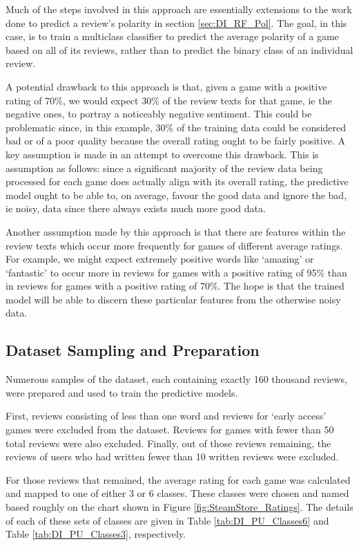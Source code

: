 Much of the steps involved in this approach are essentially extensions to the work done to predict a review's polarity in section \ref{sec:DI_RF_Pol}. The goal, in this case, is to train a multiclass classifier to predict the average polarity of a game based on all of its reviews, rather than to predict the binary class of an individual review.

A potential drawback to this approach is that, given a game with a positive rating of 70\%, we would expect 30\% of the review texts for that game, ie the negative ones, to portray a noticeably negative sentiment. This could be problematic since, in this example, 30\% of the training data could be considered bad or of a poor quality because the overall rating ought to be fairly positive. A key assumption is made in an attempt to overcome this drawback. This is assumption as follows: since a significant majority of the review data being processed for each game does actually align with its overall rating, the predictive model ought to be able to, on average, favour the good data and ignore the bad, ie noisy, data since there always exists much more good data.

Another assumption made by this approach is that there are features within the review texts which occur more frequently for games of different average ratings. For example, we might expect extremely positive words like `amazing' or `fantastic' to occur more in reviews for games with a positive rating of 95\% than in reviews for games with a positive rating of 70\%. The hope is that the trained model will be able to discern these particular features from the otherwise noisy data.

\subsection{Dataset Sampling and Preparation}

Numerous samples of the dataset, each containing exactly 160 thousand reviews, were prepared and used to train the predictive models.

First, reviews consisting of less than one word and reviews for `early access' games were excluded from the dataset. Reviews for games with fewer than 50 total reviews were also excluded. Finally, out of those reviews remaining, the reviews of users who had written fewer than 10 written reviews were excluded.

For those reviews that remained, the average rating for each game was calculated and mapped to one of either 3 or 6 classes. These classes were chosen and named based roughly on the chart shown in Figure \ref{fig:SteamStore_Ratings}. The details of each of these sets of classes are given in Table \ref{tab:DI_PU_Classes6} and Table \ref{tab:DI_PU_Classes3}, respectively.

